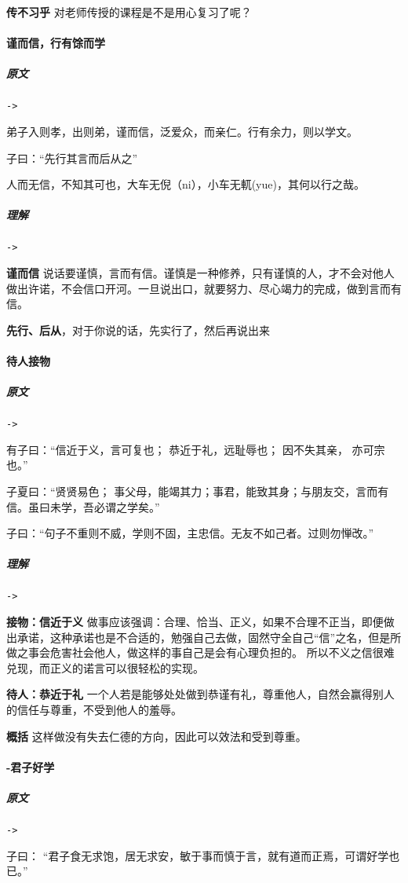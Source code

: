 \documentclass[UTF8,a4paper,8pt]{ctexbook}
\begin{document}
				\textbf{传不习乎} 对老师传授的课程是不是用心复习了呢？
			
		\paragraph{谨而信，行有馀而学}
			\subparagraph{原文}\verb|->|
		
				弟子入则孝，出则弟，谨而信，泛爱众，而亲仁。行有余力，则以学文。
			
			
				子曰：“先行其言而后从之”
				
				
				人而无信，不知其可也，大车无倪（ni），小车无軏(yue)，其何以行之哉。
				
			\subparagraph{理解}\verb|->|
			
				\textbf{谨而信} 说话要谨慎，言而有信。谨慎是一种修养，只有谨慎的人，才不会对他人做出许诺，不会信口开河。一旦说出口，就要努力、尽心竭力的完成，做到言而有信。
	
				\textbf{先行、后从}，对于你说的话，先实行了，然后再说出来
				
				
		\paragraph{待人接物}
			\subparagraph{原文}\verb|->|
			
				有子曰：“信近于义，言可复也； 恭近于礼，远耻辱也； 因不失其亲， 亦可宗也。”
			
				子夏曰：“贤贤易色； 事父母，能竭其力；事君，能致其身；与朋友交，言而有信。虽曰未学，吾必谓之学矣。”
				
				子曰：“句子不重则不威，学则不固，主忠信。无友不如己者。过则勿惮改。”
			\subparagraph{理解}\verb|->|
			
				\textbf{接物：信近于义} 做事应该强调：合理、恰当、正义，如果不合理不正当，即便做出承诺，这种承诺也是不合适的，勉强自己去做，固然守全自己“信”之名，但是所做之事会危害社会他人，做这样的事自己是会有心理负担的。 所以不义之信很难兑现，而正义的诺言可以很轻松的实现。
				
				\textbf{待人：恭近于礼} 一个人若是能够处处做到恭谨有礼，尊重他人，自然会赢得别人的信任与尊重，不受到他人的羞辱。
			
				\textbf{概括} 这样做没有失去仁德的方向，因此可以效法和受到尊重。
			
		\paragraph{-君子好学}
			\subparagraph{原文}\verb|->|
			
				子曰： “君子食无求饱，居无求安，敏于事而慎于言，就有道而正焉，可谓好学也已。”	
			
\end{document}
